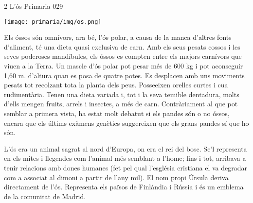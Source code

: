 \begin{news}
{2} %
{L'ós}
{}
{Primaria}
{029} %

\noindent\texttt{[image: primaria/img/os.png]}

Els óssos són omnívors, ara bé, l'ós polar, a causa de la manca d'altres fonts d'aliment, té una dieta quasi exclusiva de carn. Amb els seus pesats cossos i les seves poderoses mandíbules, els óssos es compten entre els majors carnívors que viuen a la Terra. Un mascle d'ós polar pot pesar més de 600 kg i pot aconseguir 1,60 m. d'altura quan es posa de quatre potes. Es desplacen amb uns moviments pesats tot  recolzant tota la planta dels peus. Posseeixen orelles curtes i cua rudimentària. Tenen una dieta variada i, tot i la seva temible dentadura, molts d'ells mengen fruits, arrels i insectes, a més de carn. 
Contràriament al que pot semblar a primera vista, ha estat molt debatut si els pandes són o no óssos, encara que els últims exàmens genètics suggereixen que els grans pandes sí que ho són.


L'ós era un animal sagrat al nord d'Europa, on era el rei del bosc. Se'l representa en els mites i llegendes com l'animal més semblant a l’home; fins i tot, arribava a tenir relacions amb dones humanes (fet pel qual l'església cristiana el va degradar com a associat al dimoni a partir de l'any mil). El nom propi Úrsula deriva directament de l'ós. Representa els països de Finlàndia i Rússia i és un emblema de la comunitat de Madrid.





\end{news}
